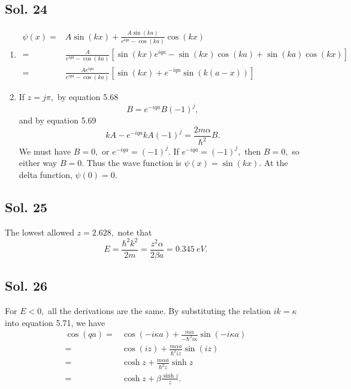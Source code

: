    \subsection*{Sol. 24}
   \begin{enumerate}
       \item 
       \begin{align*}
           \psi(x)
           =
           &A\sin(kx) + \frac{A\sin(ka)}{e^{iqa}-\cos(ka)}\cos(kx)\\
           =&
           \frac{A}{e^{iqa}-\cos(ka)}[\sin(kx)e^{iqa}-\sin(kx)\cos(ka)
           +\sin(ka)\cos(kx)]\\
           =&
           \frac{Ae^{iqa}}{e^{iqa}-\cos(ka)}
           [\sin(kx)+e^{-iqa}\sin(k(a-x))]
       \end{align*}
       \item 
       If $z=j\pi,$ 
        by equation 5.68
        $$
        B = e^{-iqa}B(-1)^j,
        $$
        and by equation 5.69
        $$
        kA-e^{-iqa}kA(-1)^j = \frac{2m\alpha}{\hbar^2}B.
        $$
        We must have $B=0,$ or $e^{-iqa}=(-1)^j.$ If $e^{-iqa}=(-1)^j,$ then $B=0,$ so either way $B=0.$
        Thus the wave function is $\psi(x)=\sin(kx).$ At the delta function, $\psi(0)=0.$
   \end{enumerate}

   \subsection*{Sol. 25}
   The lowest allowed $z=2.628,$ note that 
   $$
   E = \frac{\hbar^2k^2}{2m} = \frac{z^2\alpha}{2\beta a} = \qty{0.345}{eV}.
   $$

   \subsection*{Sol. 26}
   For $E<0,$ 
   all the derivations are the same. By substituting the relation $ik=\kappa$ into equation 5.71, 
   we have 
   \begin{align*}
       \cos(qa) =& \cos(-i\kappa a) + \frac{m\alpha}{-\hbar^2i\kappa}\sin(-i\kappa a)\\
       =& \cos(iz) + \frac{m\alpha a}{\hbar^2i z}\sin(iz)\\
       =&\cosh z + \frac{m\alpha a}{\hbar^2 z}\sinh z\\
       =&\cosh z + \beta\frac{\sinh z}{z}.
   \end{align*}
   
    
